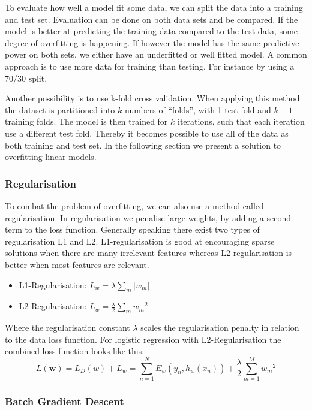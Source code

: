 To evaluate how well a model fit some data, we can split the data into a training and test set. Evaluation can be done on both data sets and be compared. If the model is better at predicting the training data compared to the test data, some degree of overfitting is happening. If however the model has the same predictive power on both sets, we either have an underfitted or well fitted model. A common approach is to use more data for training than testing. For instance by using a 70/30 split.

Another possibility is to use k-fold cross validation.
When applying this method the dataset is partitioned into $k$ numbers of ``folds'', with 1 test fold and $k-1$ training folds.
The model is then trained for $k$ iterations, such that each iteration use a different test fold.
Thereby it becomes possible to use all of the data as both training and test set. In the following section we present a solution to overfitting linear models.

\subsubsection{Regularisation}

To combat the problem of overfitting, we can also use a method called regularisation.
In regularisation we penalise large weights, by adding a second term to the loss function.
Generally speaking there exist two types of regularisation L1 and L2.
L1-regularisation is good at encouraging sparse solutions when there are many irrelevant features whereas L2-regularisation is better when most features are relevant.

\begin{itemize}
\item L1-Regularisation: $L_w = \lambda \sum_{m} \vert w_m \vert $
\item L2-Regularisation: $L_w = \frac{\lambda}{2} \sum_{m} {w_m}^2$
\end{itemize}

Where the regularisation constant $\lambda$ scales the regularisation penalty in relation to the data loss function. For logistic regression with L2-Regularisation the combined loss function looks like this.
\[ L(\mathbf{w})
  = L_D(w) + L_w 
  = \sum_{n=1}^N E_w(y_n, h_w(x_n)) + \frac{\lambda}{2} \sum_{m=1}^{M} {w_m}^2 \] 

\subsubsection{Batch Gradient Descent}\label{sec:batch}

